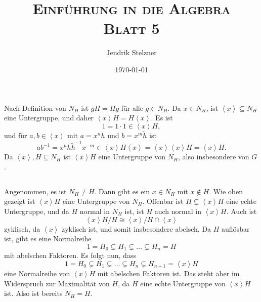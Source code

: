 \documentclass[a4paper,10pt]{article}
\title{\textsc{Einführung in die Algebra \\ \Large Blatt 5}}
\author{Jendrik Stelzner}
\date{\today}
\theoremstyle{definition}
\newcommand{\gen}[1]{\left\langle#1\right\rangle}
\begin{document}
\maketitle





\section{}


\subsection{}
Nach Definition von $N_H$ ist $gH = Hg$ für alle $g \in N_H$. Da $x \in N_H$, ist $\gen{x} \subseteq N_H$ eine Untergruppe, und daher $\gen{x}H = H\gen{x}$.
Es ist
\[
 1 = 1 \cdot 1 \in \gen{x}H,
\]
und für $a,b \in \gen{x}$ mit $a = x^n h$ und $b = x^m \tilde{h}$ ist
\[
 ab^{-1} = x^n h \tilde{h}^{-1} x^{-m} \in \gen{x} H \gen{x} = \gen{x} \gen{x} H = \gen{x} H.
\]
Da $\gen{x}, H \subseteq N_H$ ist $\gen{x}H$ eine Untergruppe von $N_H$, also insbesondere von $G$.


\subsection{}
Angenommen, es ist $N_H \neq H$. Dann gibt es ein $x \in N_H$ mit $x \not\in H$. Wie oben gezeigt ist $\gen{x}H$ eine Untergruppe von $N_H$. Offenbar ist $H \subsetneq \gen{x}H$ eine echte Untergruppe, und da $H$ normal in $N_H$ ist, ist $H$ auch normal in $\gen{x}H$. Auch ist
\[
 \gen{x}\!H/H \cong \gen{x}/H \cap \gen{x}
\]
zyklisch, da $\gen{x}$ zyklisch ist, und somit insbesondere abelsch. Da $H$ auflösbar ist, gibt es eine Normalreihe
\[
 1 = H_0 \subsetneq H_1 \subsetneq \ldots \subsetneq H_n = H
\]
mit abelschen Faktoren. Es folgt nun, dass
\[
 1 = H_0 \subsetneq H_1 \subsetneq \ldots \subsetneq H_n \subsetneq H_{n+1} = \gen{x}H
\]
eine Normalreihe von $\gen{x}H$ mit abelschen Faktoren ist. Das steht aber im Widerspruch zur Maximalität von $H$, da $H$ eine echte Untergruppe von $\gen{x}H$ ist. Also ist bereits $N_H = H$.


\section{}

\subsection{}
\end{document}
